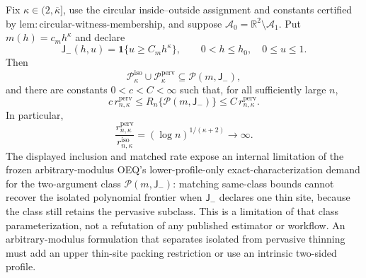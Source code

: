 Fix \(\kappa\in(2,\overline\kappa]\), use the circular inside--outside assignment and constants certified by \(\mathrm{lem:circular\text{-}witness\text{-}membership}\), and suppose \(\mathcal A_0=\mathbb R^2\setminus\mathcal A_1\).  Put \(m(h)=c_mh^\kappa\) and declare
\[
 \mathsf J_{-}(h,u)=\mathbf 1\{u\ge C_mh^\kappa\},
 \qquad 0<h\le h_0,\quad 0\le u\le1.
\]
Then
\[
 \mathcal P_{\kappa}^{\mathrm{iso}}\cup
 \mathcal P_{\kappa}^{\mathrm{perv}}
 \subseteq \mathcal P(m,\mathsf J_{-}),
\]
and there are constants \(0<c<C<\infty\) such that, for all sufficiently large \(n\),
\[
 c\,r_{n,\kappa}^{\mathrm{perv}}
 \le R_n\{\mathcal P(m,\mathsf J_{-})\}
 \le C\,r_{n,\kappa}^{\mathrm{perv}}.
\]
In particular,
\[
 \frac{r_{n,\kappa}^{\mathrm{perv}}}
 {r_{n,\kappa}^{\mathrm{iso}}}
 =(\log n)^{1/(\kappa+2)}\longrightarrow\infty.
\]
The displayed inclusion and matched rate expose an internal limitation of the frozen arbitrary-modulus OEQ's lower-profile-only exact-characterization demand for the two-argument class \(\mathcal P(m,\mathsf J_{-})\): matching same-class bounds cannot recover the isolated polynomial frontier when \(\mathsf J_{-}\) declares one thin site, because the class still retains the pervasive subclass. This is a limitation of that class parameterization, not a refutation of any published estimator or workflow. An arbitrary-modulus formulation that separates isolated from pervasive thinning must add an upper thin-site packing restriction or use an intrinsic two-sided profile.